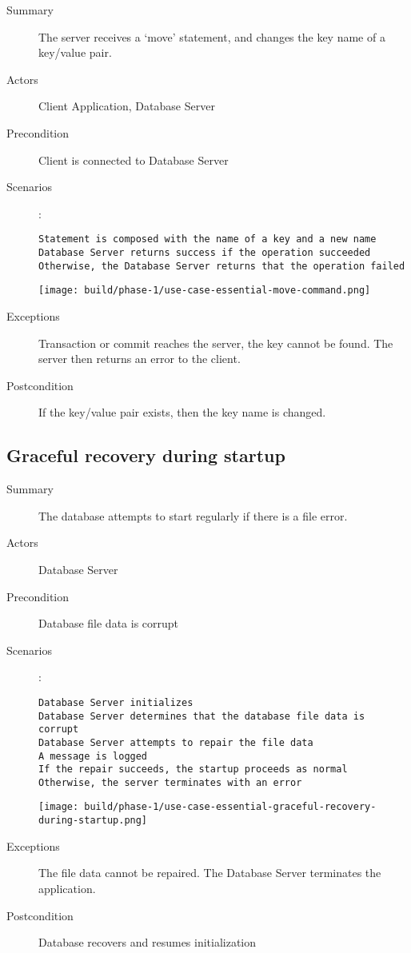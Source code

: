 \documentclass[a4paper]{report}
\begin{document}
	\begin{description}
		\item[Summary] The server receives a ‘move’ statement, and changes the key name of a key/value pair.
		\item[Actors] Client Application, Database Server
		\item[Precondition] Client is connected to Database Server 
		\item[Scenarios] :

		\begin{lstlisting}
Statement is composed with the name of a key and a new name
Database Server returns success if the operation succeeded
Otherwise, the Database Server returns that the operation failed
		\end{lstlisting}

		\begin{center}
			\texttt{[image: build/phase-1/use-case-essential-move-command.png]}
		\end{center}

		\item[Exceptions] Transaction or commit reaches the server, the key cannot be found.  The server then returns an error to the client.
		\item[Postcondition] If the key/value pair exists, then the key name is changed.
	\end{description}

	\pagebreak

	\subsection{Graceful recovery during startup}

	\begin{description}
		\item[Summary] The database attempts to start regularly if there is a file error.
		\item[Actors] Database Server
		\item[Precondition] Database file data is corrupt
		\item[Scenarios] :

		\begin{lstlisting}
Database Server initializes
Database Server determines that the database file data is corrupt
Database Server attempts to repair the file data
A message is logged
If the repair succeeds, the startup proceeds as normal
Otherwise, the server terminates with an error
		\end{lstlisting}

		\begin{center}
			\texttt{[image: build/phase-1/use-case-essential-graceful-recovery-during-startup.png]}
		\end{center}

		\item[Exceptions] The file data cannot be repaired.  The Database Server terminates the application.
		\item[Postcondition] Database recovers and resumes initialization
	\end{description}
\end{document}
